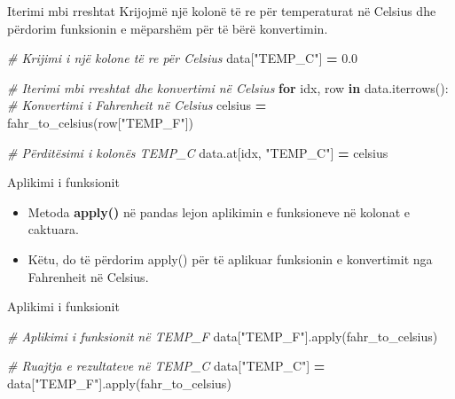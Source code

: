 \documentclass[
  ignorenonframetext,
]{beamer}
\newenvironment{Shaded}{\begin{snugshade}}{\end{snugshade}}
\newcommand{\BuiltInTok}[1]{#1}
\newcommand{\CommentTok}[1]{\textcolor[rgb]{0.56,0.35,0.01}{\textit{#1}}}
\newcommand{\ControlFlowTok}[1]{\textcolor[rgb]{0.13,0.29,0.53}{\textbf{#1}}}
\newcommand{\FloatTok}[1]{\textcolor[rgb]{0.00,0.00,0.81}{#1}}
\newcommand{\KeywordTok}[1]{\textcolor[rgb]{0.13,0.29,0.53}{\textbf{#1}}}
\newcommand{\NormalTok}[1]{#1}
\newcommand{\OperatorTok}[1]{\textcolor[rgb]{0.81,0.36,0.00}{\textbf{#1}}}
\newcommand{\StringTok}[1]{\textcolor[rgb]{0.31,0.60,0.02}{#1}}
\begin{document}
\begin{frame}[fragile]{Iterimi mbi rreshtat}
\protect\hypertarget{iterimi-mbi-rreshtat-2}{}
Krijojmë një kolonë të re për temperaturat në Celsius dhe përdorim
funksionin e mëparshëm për të bërë konvertimin.

\begin{Shaded}
\begin{Highlighting}[]
\CommentTok{\# Krijimi i një kolone të re për Celsius}
\NormalTok{data[}\StringTok{"TEMP\_C"}\NormalTok{] }\OperatorTok{=} \FloatTok{0.0}

\CommentTok{\# Iterimi mbi rreshtat dhe konvertimi në Celsius}
\ControlFlowTok{for}\NormalTok{ idx, row }\KeywordTok{in}\NormalTok{ data.iterrows():}
    \CommentTok{\# Konvertimi i Fahrenheit në Celsius}
\NormalTok{    celsius }\OperatorTok{=}\NormalTok{ fahr\_to\_celsius(row[}\StringTok{"TEMP\_F"}\NormalTok{])}
    
    \CommentTok{\# Përditësimi i kolonës TEMP\_C}
\NormalTok{    data.at[idx, }\StringTok{"TEMP\_C"}\NormalTok{] }\OperatorTok{=}\NormalTok{ celsius}
\end{Highlighting}
\end{Shaded}
\end{frame}

\begin{frame}{Aplikimi i funksionit}
\protect\hypertarget{aplikimi-i-funksionit}{}
\begin{itemize}
\item
  Metoda \textbf{apply()} në pandas lejon aplikimin e funksioneve në
  kolonat e caktuara.
\item
  Këtu, do të përdorim apply() për të aplikuar funksionin e konvertimit
  nga Fahrenheit në Celsius.
\end{itemize}
\end{frame}

\begin{frame}[fragile]{Aplikimi i funksionit}
\protect\hypertarget{aplikimi-i-funksionit-1}{}
\begin{Shaded}
\begin{Highlighting}[]
\CommentTok{\# Aplikimi i funksionit në TEMP\_F}
\NormalTok{data[}\StringTok{"TEMP\_F"}\NormalTok{].}\BuiltInTok{apply}\NormalTok{(fahr\_to\_celsius)}

\CommentTok{\# Ruajtja e rezultateve në TEMP\_C}
\NormalTok{data[}\StringTok{"TEMP\_C"}\NormalTok{] }\OperatorTok{=}\NormalTok{ data[}\StringTok{"TEMP\_F"}\NormalTok{].}\BuiltInTok{apply}\NormalTok{(fahr\_to\_celsius)}
\end{Highlighting}
\end{Shaded}
\end{frame}
\end{document}
